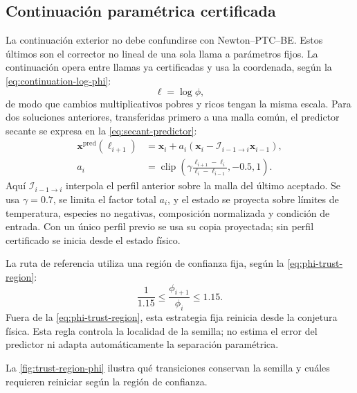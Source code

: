 \documentclass[12pt,a4paper,twoside,openany]{book}
\newcommand{\vect}[1]{\bm{#1}}
\begin{document}
\subsection{Continuación paramétrica certificada}

La continuación exterior no debe confundirse con Newton--PTC--BE. Estos últimos
son el corrector no lineal de una sola llama a parámetros fijos. La continuación
opera entre llamas ya certificadas y usa la coordenada, según la \cref{eq:continuation-log-phi}:
\begin{equation}
  \ell=\log\phi,
  \label{eq:continuation-log-phi}
\end{equation}
de modo que cambios multiplicativos pobres y ricos tengan la misma escala.
Para dos soluciones anteriores, transferidas primero a una malla común, el
predictor secante se expresa en la \cref{eq:secant-predictor}:
\begin{equation}
 \begin{aligned}
  \vect{x}^{\mathrm{pred}}(\ell_{i+1})&=
  \vect{x}_{i}+a_i
  \left(\vect{x}_{i}-\mathcal I_{i-1\rightarrow i}\vect{x}_{i-1}\right),\\
  a_i&=\operatorname{clip}\!\left(
  \gamma\frac{\ell_{i+1}-\ell_i}{\ell_i-\ell_{i-1}},-0.5,1\right).
 \end{aligned}
  \label{eq:secant-predictor}
\end{equation}
Aquí \(\mathcal I_{i-1\rightarrow i}\) interpola el perfil anterior sobre la
malla del último aceptado. Se usa \(\gamma=0.7\), se limita el factor total
\(a_i\), y el estado se
proyecta sobre límites de temperatura, especies no negativas, composición
normalizada y condición de entrada. Con un único perfil previo se usa su copia
proyectada; sin perfil certificado se inicia desde el estado físico.

La ruta de referencia utiliza una región de confianza fija, según la \cref{eq:phi-trust-region}:
\begin{equation}
  \frac{1}{1.15}\le\frac{\phi_{i+1}}{\phi_i}\le1.15.
  \label{eq:phi-trust-region}
\end{equation}
Fuera de la \cref{eq:phi-trust-region}, esta estrategia fija reinicia desde la
conjetura física. Esta regla controla la localidad de la semilla; no estima el error del
predictor ni adapta automáticamente la separación paramétrica.

La \cref{fig:trust-region-phi} ilustra qué transiciones conservan la semilla
y cuáles requieren reiniciar según la región de confianza.
\end{document}
